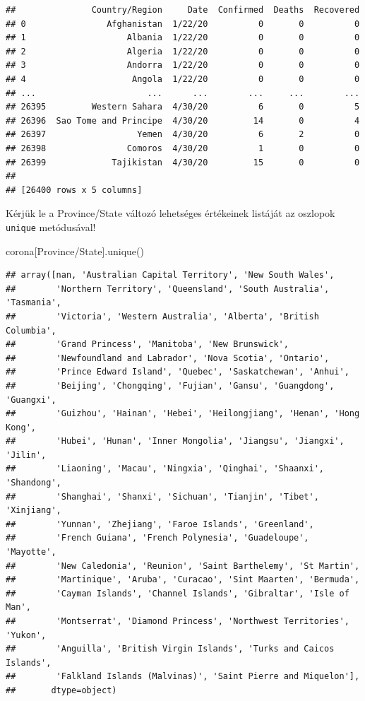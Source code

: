 \documentclass[
]{book}
\newenvironment{Shaded}{\begin{snugshade}}{\end{snugshade}}
\newcommand{\NormalTok}[1]{#1}
\newcommand{\StringTok}[1]{\textcolor[rgb]{0.31,0.60,0.02}{#1}}
\begin{document}
\begin{verbatim}
##               Country/Region     Date  Confirmed  Deaths  Recovered
## 0                Afghanistan  1/22/20          0       0          0
## 1                    Albania  1/22/20          0       0          0
## 2                    Algeria  1/22/20          0       0          0
## 3                    Andorra  1/22/20          0       0          0
## 4                     Angola  1/22/20          0       0          0
## ...                      ...      ...        ...     ...        ...
## 26395         Western Sahara  4/30/20          6       0          5
## 26396  Sao Tome and Principe  4/30/20         14       0          4
## 26397                  Yemen  4/30/20          6       2          0
## 26398                Comoros  4/30/20          1       0          0
## 26399             Tajikistan  4/30/20         15       0          0
## 
## [26400 rows x 5 columns]
\end{verbatim}

Kérjük le a Province/State változó lehetséges értékeinek listáját az oszlopok \texttt{unique} metódusával!

\begin{Shaded}
\begin{Highlighting}[]
\NormalTok{corona[}\StringTok{\textquotesingle{}Province/State\textquotesingle{}}\NormalTok{].unique()}
\end{Highlighting}
\end{Shaded}

\begin{verbatim}
## array([nan, 'Australian Capital Territory', 'New South Wales',
##        'Northern Territory', 'Queensland', 'South Australia', 'Tasmania',
##        'Victoria', 'Western Australia', 'Alberta', 'British Columbia',
##        'Grand Princess', 'Manitoba', 'New Brunswick',
##        'Newfoundland and Labrador', 'Nova Scotia', 'Ontario',
##        'Prince Edward Island', 'Quebec', 'Saskatchewan', 'Anhui',
##        'Beijing', 'Chongqing', 'Fujian', 'Gansu', 'Guangdong', 'Guangxi',
##        'Guizhou', 'Hainan', 'Hebei', 'Heilongjiang', 'Henan', 'Hong Kong',
##        'Hubei', 'Hunan', 'Inner Mongolia', 'Jiangsu', 'Jiangxi', 'Jilin',
##        'Liaoning', 'Macau', 'Ningxia', 'Qinghai', 'Shaanxi', 'Shandong',
##        'Shanghai', 'Shanxi', 'Sichuan', 'Tianjin', 'Tibet', 'Xinjiang',
##        'Yunnan', 'Zhejiang', 'Faroe Islands', 'Greenland',
##        'French Guiana', 'French Polynesia', 'Guadeloupe', 'Mayotte',
##        'New Caledonia', 'Reunion', 'Saint Barthelemy', 'St Martin',
##        'Martinique', 'Aruba', 'Curacao', 'Sint Maarten', 'Bermuda',
##        'Cayman Islands', 'Channel Islands', 'Gibraltar', 'Isle of Man',
##        'Montserrat', 'Diamond Princess', 'Northwest Territories', 'Yukon',
##        'Anguilla', 'British Virgin Islands', 'Turks and Caicos Islands',
##        'Falkland Islands (Malvinas)', 'Saint Pierre and Miquelon'],
##       dtype=object)
\end{verbatim}
\end{document}
